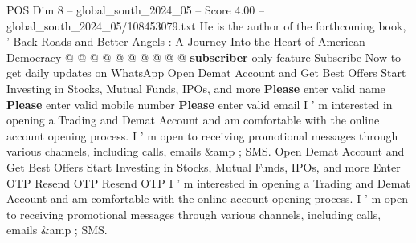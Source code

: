 \begin{textsample}{POS Dim 8 – global\_south\_2024\_05 – Score 4.00 – global\_south\_2024\_05/108453079.txt}
He is the author of the forthcoming book, ' Back Roads and Better Angels : A Journey Into the Heart of American Democracy @ @ @ @ @ @ @ @ @ @ \textbf{subscriber} only feature Subscribe Now to get daily updates on WhatsApp Open Demat Account and Get Best Offers Start Investing in Stocks, Mutual Funds, IPOs, and more \textbf{Please} enter valid name \textbf{Please} enter valid mobile number \textbf{Please} enter valid email I ' m interested in opening a Trading and Demat Account and am comfortable with the online account opening process.
I ' m open to receiving promotional messages through various channels, including calls, emails \&amp ; SMS.
Open Demat Account and Get Best Offers Start Investing in Stocks, Mutual Funds, IPOs, and more Enter OTP Resend OTP Resend OTP I ' m interested in opening a Trading and Demat Account and am comfortable with the online account opening process.
I ' m open to receiving promotional messages through various channels, including calls, emails \&amp ; SMS.

\end{textsample}
